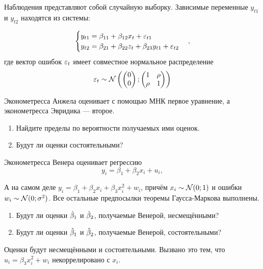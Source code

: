 \begin{problem}
Наблюдения представляют собой случайную выборку. Зависимые переменные $y_{t1}$ и $y_{t2}$ находятся из системы:

\[
\begin{cases}
y_{t1} = \beta_{11} + \beta_{12} x_t + \varepsilon_{t1} \\
y_{t2} = \beta_{21} + \beta_{22} z_t + \beta_{23} y_{t1} + \varepsilon_{t2}
\end{cases},
\]
где вектор ошибок $\varepsilon_t$ имеет совместное нормальное распределение
\[
\varepsilon_t \sim \mathcal{N}\left(
\begin{pmatrix}
  0 \\
  0
\end{pmatrix};
\begin{pmatrix}
  1 & \rho \\
  \rho & 1
\end{pmatrix}
\right)
\]

Эконометресса Анжела оценивает с помощью МНК первое уравнение, а эконометресса Эвридика — второе.
\begin{enumerate}
\item Найдите пределы по вероятности получаемых ими оценок.
\item Будут ли оценки состоятельными?
\end{enumerate}

\begin{sol}
\end{sol}
\end{problem}


\begin{problem}
  Эконометресса Венера оценивает регрессию
  \[
    y_i = \beta_1 + \beta_2 x_i + u_i,
  \]

  А на самом деле $y_i = \beta_1 + \beta_2 x_i + \beta_3 x_i^2 + w_i$, причём $x_i \sim \mathcal{N} (0; 1)$ и ошибки $w_i \sim \mathcal{N}(0; \sigma^2)$. Все остальные предпосылки теоремы Гаусса-Маркова выполнены.

  \begin{enumerate}
    \item Будут ли оценки $\hat{\beta}_1$ и $\hat{\beta}_2$, получаемые Венерой, несмещёнными?
    \item Будут ли оценки $\hat{\beta}_1$ и $\hat{\beta}_2$, получаемые Венерой, состоятельными?
  \end{enumerate}

\begin{sol}
  Оценки будут несмещёнными и состоятельными. Вызвано это тем, что $u_i = \beta_3 x_i^2 + w_i$ некоррелировано с $x_i$.
\end{sol}
\end{problem}

